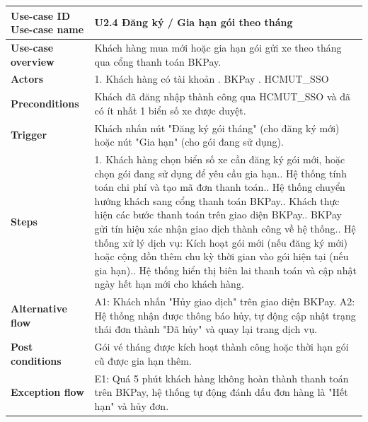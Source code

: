 \begin{tabularx}{\textwidth}{|>{\raggedright\arraybackslash}p{4cm}|X|}
\hline
\textbf{Use-case ID} \newline \textbf{Use-case name} & U2.4 \newline \textbf{Đăng ký / Gia hạn gói theo tháng} \\ \hline
\textbf{Use-case overview} & Khách hàng mua mới hoặc gia hạn gói gửi xe theo tháng qua cổng thanh toán BKPay. \\ \hline
\textbf{Actors} & 1. Khách hàng có tài khoản \newline 2. BKPay \newline 3. HCMUT\_SSO \\ \hline
\textbf{Preconditions} & Khách đã đăng nhập thành công qua HCMUT\_SSO và đã có ít nhất 1 biển số xe được duyệt. \\ \hline
\textbf{Trigger} & Khách nhấn nút "Đăng ký gói tháng" (cho đăng ký mới) hoặc nút "Gia hạn" (cho gói đang sử dụng). \\ \hline

\textbf{Steps} &
1. Khách hàng chọn biển số xe cần đăng ký gói mới, hoặc chọn gói đang sử dụng để yêu cầu gia hạn.\newline
2. Hệ thống tính toán chi phí và tạo mã đơn thanh toán.\newline
3. Hệ thống chuyển hướng khách sang cổng thanh toán BKPay.\newline
4. Khách thực hiện các bước thanh toán trên giao diện BKPay.\newline
5. BKPay gửi tín hiệu xác nhận giao dịch thành công về hệ thống.\newline
6. Hệ thống xử lý dịch vụ: Kích hoạt gói mới (nếu đăng ký mới) hoặc cộng dồn thêm chu kỳ thời gian vào gói hiện tại (nếu gia hạn).\newline
7. Hệ thống hiển thị biên lai thanh toán và cập nhật ngày hết hạn mới cho khách hàng. \\ \hline

\textbf{Alternative flow} &
A1: Khách nhấn "Hủy giao dịch" trên giao diện BKPay.\newline
A2: Hệ thống nhận được thông báo hủy, tự động cập nhật trạng thái đơn thành "Đã hủy" và quay lại trang dịch vụ. \\ \hline

\textbf{Post conditions} & Gói vé tháng được kích hoạt thành công hoặc thời hạn gói cũ được gia hạn thêm. \\ \hline

\textbf{Exception flow} &
E1: Quá 5 phút khách hàng không hoàn thành thanh toán trên BKPay, hệ thống tự động đánh dấu đơn hàng là "Hết hạn" và hủy đơn. \\ \hline
\end{tabularx}

